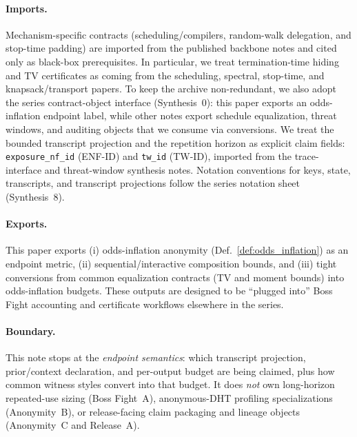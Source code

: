 \documentclass[11pt]{article}
\theoremstyle{definition}
\theoremstyle{remark}
\begin{document}
\paragraph{Imports.}
Mechanism-specific contracts (scheduling/compilers, random-walk delegation, and stop-time padding) are imported from the published backbone notes and cited only as black-box prerequisites.
In particular, we treat termination-time hiding and TV certificates as coming from the scheduling, spectral, stop-time, and knapsack/transport papers.\cite{series:schedcompiler,series:spectral,series:stoptimeaddendum,series:knapsacktransport}
To keep the archive non-redundant, we also adopt the series contract-object interface (Synthesis~0): this paper exports an odds-inflation endpoint label, while other notes export schedule equalization, threat windows, and auditing objects that we consume via conversions.\cite{series:contractobjects}
We treat the bounded transcript projection and the repetition horizon as explicit claim fields: \texttt{exposure\_nf\_id} (ENF-ID) and \texttt{tw\_id} (TW-ID), imported from the trace-interface and threat-window synthesis notes.\cite{series:traceifaces,series:threatwindows}
Notation conventions for keys, state, transcripts, and transcript projections follow the series notation sheet (Synthesis~8).\cite{series:notation}


\paragraph{Exports.}
This paper exports (i) odds-inflation anonymity (Def.~\ref{def:odds_inflation}) as an endpoint metric, (ii) sequential/interactive composition bounds, and (iii) tight conversions from common equalization contracts (TV and moment bounds) into odds-inflation budgets.
These outputs are designed to be ``plugged into'' Boss Fight accounting and certificate workflows elsewhere in the series.\cite{series:endpointbridge}

\paragraph{Boundary.}
This note stops at the \emph{endpoint semantics}: which transcript projection, prior/context declaration, and per-output budget are being claimed, plus how common witness styles convert into that budget.
It does \emph{not} own long-horizon repeated-use sizing (Boss Fight~A), anonymous-DHT profiling specializations (Anonymity~B), or release-facing claim packaging and lineage objects (Anonymity~C and Release~A).\cite{series:bossfightA,series:profiling,series:abomoinl,series:releaseA}
\end{document}
